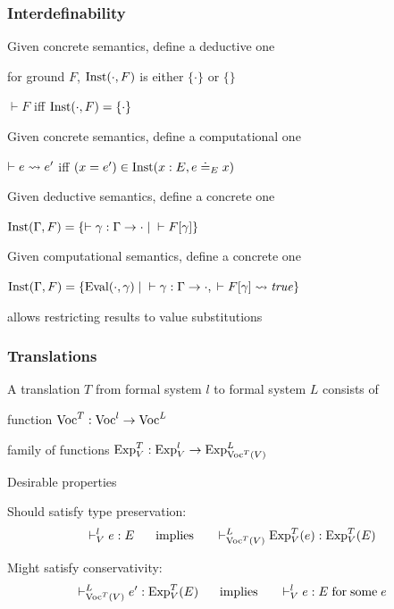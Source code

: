 \begin{frame}\frametitle{Interdefinability}
\begin{blockitems}{Given concrete semantics, define a deductive one}
\item for ground $F$, $\mathrm{Inst}(\cdot,F)$ is either $\{\cdot\}$ or $\{\}$
\item $\vdash F$ iff $\mathrm{Inst}(\cdot, F)=\{\cdot\}$
\end{blockitems}

\begin{blockitems}{Given concrete semantics, define a computational one}
\item $\vdash e\rightsquigarrow e'$ iff $(x=e')\in\mathrm{Inst}(x:E, e\doteq_E x)$
\end{blockitems}

\begin{blockitems}{Given deductive semantics, define a concrete one}
\item $\mathrm{Inst}(\Gamma,F)=\{\vdash \gamma:\Gamma\to\cdot \;|\;\vdash F[\gamma]\}$
\end{blockitems}

\begin{blockitems}{Given computational semantics, define a concrete one}
\item $\mathrm{Inst}(\Gamma,F)=\{\mathrm{Eval}(\cdot,\gamma) \;|\;\vdash \gamma:\Gamma\to\cdot, \;\vdash F[\gamma]\rightsquigarrow \mathit{true}\}$
\item allows restricting results to value substitutions
\end{blockitems}
\end{frame}


\begin{frame}\frametitle{Translations}
\begin{blockitems}{A translation $T$ from formal system $l$ to formal system $L$ consists of}
\item function $\mathrm{Voc}^T:\mathrm{Voc}^l\to\mathrm{Voc}^L$
\item family of functions $\mathrm{Exp}^T_V:\mathrm{Exp}^l_V\to\mathrm{Exp}^L_{\mathrm{Voc}^T(V)}$
\end{blockitems}

\begin{blockitems}{Desirable properties}
\item Should satisfy type preservation:
\[\vdash^l_V e:E \hspace*{.5cm}\;\mathrm{implies}\;\hspace*{.5cm} \vdash^L_{\mathrm{Voc}^T(V)} \mathrm{Exp}^T_V(e):\mathrm{Exp}^T_V(E)\]
\item Might satisfy conservativity: 
\[\vdash^L_{\mathrm{Voc}^T(V)} e':\mathrm{Exp}^T_V(E) \hspace*{.5cm}\;\mathrm{implies}\;\hspace*{.5cm} \vdash^l_V e:E \;\mathrm{for}\;\mathrm{some}\; e\]
\end{blockitems}
\end{frame}

